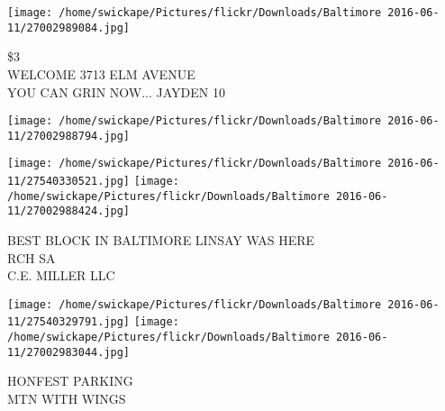 \documentclass[10pt,letterpaper]{article}
\begin{document}
\vspace{0.25in}
\texttt{[image: /home/swickape/Pictures/flickr/Downloads/Baltimore 2016-06-11/27002989084.jpg]}

\$3\\
WELCOME 3713 ELM AVENUE\\
YOU CAN GRIN NOW... JAYDEN 10
\pagebreak

\texttt{[image: /home/swickape/Pictures/flickr/Downloads/Baltimore 2016-06-11/27002988794.jpg]}

\vspace{0.25in}
\texttt{[image: /home/swickape/Pictures/flickr/Downloads/Baltimore 2016-06-11/27540330521.jpg]}
\texttt{[image: /home/swickape/Pictures/flickr/Downloads/Baltimore 2016-06-11/27002988424.jpg]}

BEST BLOCK IN BALTIMORE LINSAY WAS HERE\\
RCH SA\\
C.E. MILLER LLC
\pagebreak

\texttt{[image: /home/swickape/Pictures/flickr/Downloads/Baltimore 2016-06-11/27540329791.jpg]}
\texttt{[image: /home/swickape/Pictures/flickr/Downloads/Baltimore 2016-06-11/27002983044.jpg]}

HONFEST PARKING\\
MTN WITH WINGS
\pagebreak
\end{document}
